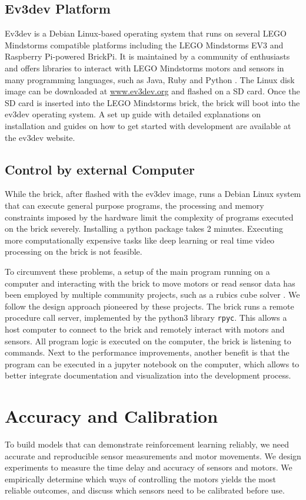 \documentclass[11pt, a4paper]{article}
\begin{document}
\subsection{Ev3dev Platform}
Ev3dev is a Debian Linux-based operating system that runs on several LEGO Mindstorms compatible platforms including the LEGO Mindstorms EV3 and Raspberry Pi-powered BrickPi. It is maintained by a community of enthusiasts and offers libraries to interact with LEGO Mindstorms motors and sensors in many programming languages, such as Java, Ruby and Python \cite{ev3dev}. The Linux disk image can be downloaded at \href{https://www.ev3dev.org/}{www.ev3dev.org} and flashed on a SD card. Once the SD card is inserted into the LEGO Mindstorms brick, the brick will boot into the ev3dev operating system. A set up guide with detailed explanations on installation and guides on how to get started with development are available at the ev3dev website.

\subsection{Control by external Computer}
While the brick, after flashed with the ev3dev image, runs a Debian Linux system that can execute general purpose programs, the processing and memory constraints imposed by the hardware limit the complexity of programs executed on the brick severely. Installing a python package takes 2 minutes. Executing more computationally expensive tasks like deep learning or real time video processing on the brick is not feasible.

To circumvent these problems, a setup of the main program running on a computer and interacting with the brick to move motors or read sensor data has been employed by multiple community projects, such as a rubics cube solver \cite{ev3_rubics}. We follow the design approach pioneered by these projects. The brick runs a remote procedure call server, implemented by the python3 library \texttt{rpyc}. This allows a host computer to connect to the brick and remotely interact with motors and sensors. All program logic is executed on the computer, the brick is listening to commands. Next to the performance improvements, another benefit is that the program can be executed in a jupyter notebook on the computer, which allows to better integrate documentation and visualization into the development process.

\section{Accuracy and Calibration}
To build models that can demonstrate reinforcement learning reliably, we need accurate and reproducible sensor measurements and motor movements. We design experiments to measure the time delay and accuracy of sensors and motors. We empirically determine which ways of controlling the motors yields the most reliable outcomes, and discuss which sensors need to be calibrated before use. 
\end{document}
